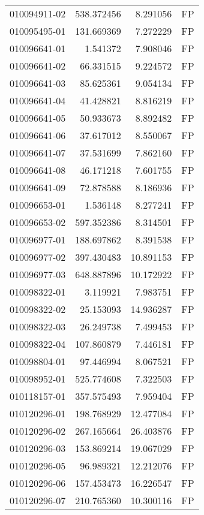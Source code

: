 \begin{tabular}{lrrl}
010094911-02 &  538.372456 &     8.291056 &   FP \\
010095495-01 &  131.669369 &     7.272229 &   FP \\
010096641-01 &    1.541372 &     7.908046 &   FP \\
010096641-02 &   66.331515 &     9.224572 &   FP \\
010096641-03 &   85.625361 &     9.054134 &   FP \\
010096641-04 &   41.428821 &     8.816219 &   FP \\
010096641-05 &   50.933673 &     8.892482 &   FP \\
010096641-06 &   37.617012 &     8.550067 &   FP \\
010096641-07 &   37.531699 &     7.862160 &   FP \\
010096641-08 &   46.171218 &     7.601755 &   FP \\
010096641-09 &   72.878588 &     8.186936 &   FP \\
010096653-01 &    1.536148 &     8.277241 &   FP \\
010096653-02 &  597.352386 &     8.314501 &   FP \\
010096977-01 &  188.697862 &     8.391538 &   FP \\
010096977-02 &  397.430483 &    10.891153 &   FP \\
010096977-03 &  648.887896 &    10.172922 &   FP \\
010098322-01 &    3.119921 &     7.983751 &   FP \\
010098322-02 &   25.153093 &    14.936287 &   FP \\
010098322-03 &   26.249738 &     7.499453 &   FP \\
010098322-04 &  107.860879 &     7.446181 &   FP \\
010098804-01 &   97.446994 &     8.067521 &   FP \\
010098952-01 &  525.774608 &     7.322503 &   FP \\
010118157-01 &  357.575493 &     7.959404 &   FP \\
010120296-01 &  198.768929 &    12.477084 &   FP \\
010120296-02 &  267.165664 &    26.403876 &   FP \\
010120296-03 &  153.869214 &    19.067029 &   FP \\
010120296-05 &   96.989321 &    12.212076 &   FP \\
010120296-06 &  157.453473 &    16.226547 &   FP \\
010120296-07 &  210.765360 &    10.300116 &   FP \\

\end{tabular}
